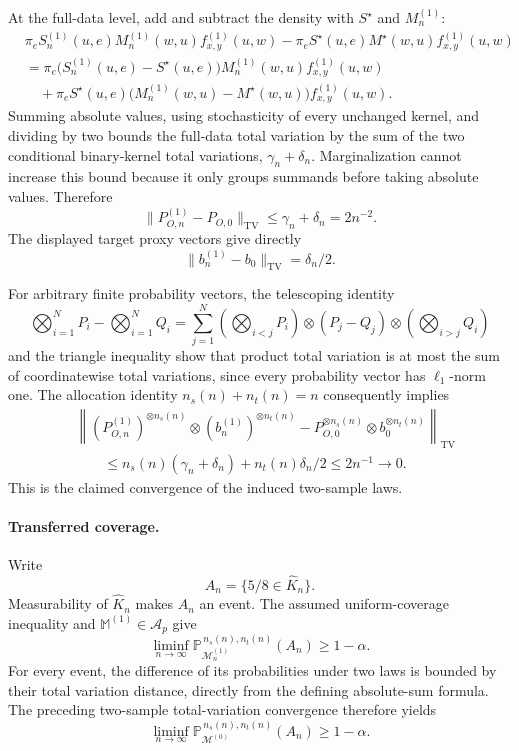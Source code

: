 At the full-data level, add and subtract the density with \(S^{\star}\) and \(M^{(1)}_n\):
\[
\begin{split}
&\pi_eS^{(1)}_n(u,e)M^{(1)}_n(w,u)f^{(1)}_{x,y}(u,w)
-\pi_eS^{\star}(u,e)M^{\star}(w,u)f^{(1)}_{x,y}(u,w)\\
&=\pi_e\bigl(S^{(1)}_n(u,e)-S^{\star}(u,e)\bigr)
M^{(1)}_n(w,u)f^{(1)}_{x,y}(u,w)\\
&\quad+\pi_eS^{\star}(u,e)
\bigl(M^{(1)}_n(w,u)-M^{\star}(w,u)\bigr)f^{(1)}_{x,y}(u,w).
\end{split}
\]
Summing absolute values, using stochasticity of every unchanged kernel, and dividing by two bounds the full-data total variation by the sum of the two conditional binary-kernel total variations, \(\gamma_n+\delta_n\). Marginalization cannot increase this bound because it only groups summands before taking absolute values. Therefore
\[
\lVert P^{(1)}_{O,n}-P_{O,0}\rVert_{\mathrm{TV}}
\le\gamma_n+\delta_n=2n^{-2}.
\]
The displayed target proxy vectors give directly
\[
\lVert b^{(1)}_n-b_0\rVert_{\mathrm{TV}}=\delta_n/2.
\]

For arbitrary finite probability vectors, the telescoping identity
\[
\bigotimes_{i=1}^N P_i-
\bigotimes_{i=1}^N Q_i
=\sum_{j=1}^N
\left(\bigotimes_{i<j}P_i\right)\otimes(P_j-Q_j)\otimes
\left(\bigotimes_{i>j}Q_i\right)
\]
and the triangle inequality show that product total variation is at most the sum of coordinatewise total variations, since every probability vector has \(\ell_1\)-norm one. The allocation identity \(n_s(n)+n_t(n)=n\) consequently implies
\[
\begin{split}
&\left\lVert
(P^{(1)}_{O,n})^{\otimes n_s(n)}\otimes(b^{(1)}_n)^{\otimes n_t(n)}
-P_{O,0}^{\otimes n_s(n)}\otimes b_0^{\otimes n_t(n)}
\right\rVert_{\mathrm{TV}}\\
&\qquad\le n_s(n)(\gamma_n+\delta_n)+n_t(n)\delta_n/2
\le 2n^{-1}\longrightarrow0.
\end{split}
\]
This is the claimed convergence of the induced two-sample laws.

\paragraph{Transferred coverage.}
Write
\[
A_n=\{5/8\in\widehat K_n\}.
\]
Measurability of \(\widehat K_n\) makes \(A_n\) an event. The assumed uniform-coverage inequality and \(\mathbb M^{(1)}\in\mathcal A_p\) give
\[
\liminf_{n\to\infty}
\mathbb P_{\mathcal M^{(1)}_n}^{\,n_s(n),n_t(n)}(A_n)
\ge1-\alpha.
\]
For every event, the difference of its probabilities under two laws is bounded by their total variation distance, directly from the defining absolute-sum formula. The preceding two-sample total-variation convergence therefore yields
\[
\liminf_{n\to\infty}
\mathbb P_{\mathcal M^{(0)}}^{\,n_s(n),n_t(n)}(A_n)
\ge1-\alpha. \tag{1}
\]

